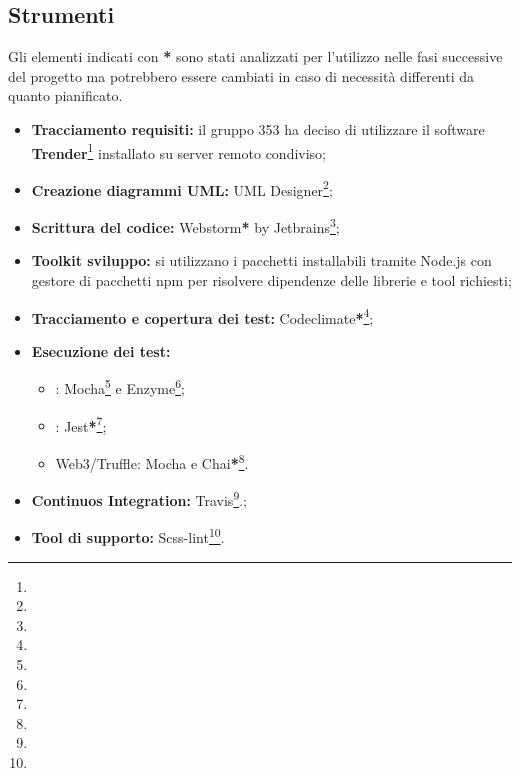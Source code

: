 \documentclass[NormeDiProgetto.tex]{subfiles}
\begin{document}
\subsection{Strumenti}
Gli elementi indicati con \textbf{*} sono stati analizzati per l'utilizzo nelle fasi successive del progetto ma potrebbero essere cambiati in caso di necessità differenti da quanto pianificato.
\begin{itemize}
	\item \textbf{Tracciamento requisiti:} il gruppo 353 ha deciso di utilizzare il software \textbf{Trender}\footnote{} installato su server remoto condiviso;
	\item \textbf{Creazione diagrammi UML:} {UML Designer}\footnote{};
	\item \textbf{Scrittura del codice:} Webstorm\textbf{*} by Jetbrains\footnote{}; 
	\item \textbf{Toolkit sviluppo:} si utilizzano i pacchetti installabili tramite Node.js con gestore di pacchetti npm per risolvere dipendenze delle librerie e tool richiesti;
	\item \textbf{Tracciamento e copertura dei test:} Codeclimate\textbf{*}\footnote{};
	\item \textbf{Esecuzione dei test:}
	\begin{itemize}
		\item {}: Mocha\footnote{} e Enzyme\footnote{};
		\item {}: Jest\textbf{*}\footnote{};
		\item Web3/Truffle: Mocha e Chai\textbf{*}\footnote{}.
	\end{itemize}
	\item \textbf{Continuos Integration:} Travis\footnote{}.;
	\item \textbf{Tool di supporto:} Scss-lint\footnote{}. 	
\end{itemize}
\end{document}
